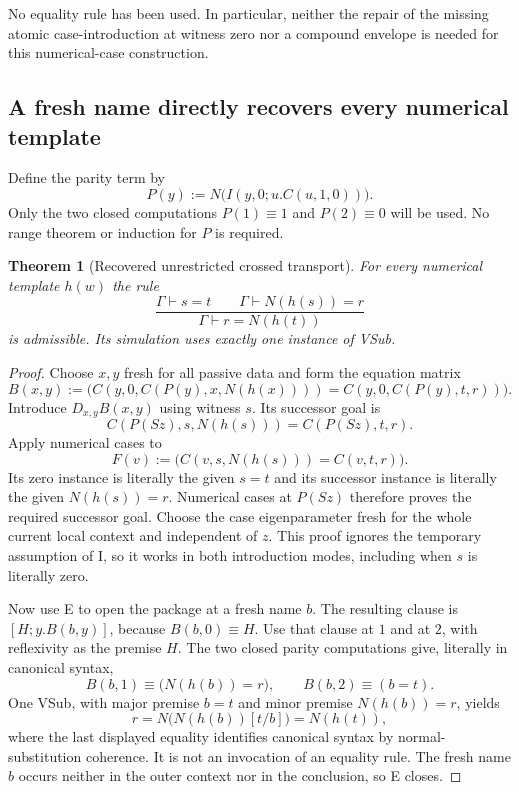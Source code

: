 \documentclass[11pt]{article}
\newtheorem{theorem}{Theorem}[section]
\theoremstyle{definition}
\theoremstyle{remark}
\begin{document}
No equality rule has been used. In particular, neither the repair of
the missing atomic case-introduction at witness zero nor a compound
envelope is needed for this numerical-case construction.

\subsection{A fresh name directly recovers every numerical template}

Define the parity term by
\[
 P(y):=N\bigl(I(y,0;u.C(u,1,0))\bigr).
\]
Only the two closed computations $P(1)\equiv1$ and $P(2)\equiv0$
will be used. No range theorem or induction for $P$ is required.

\begin{theorem}[Recovered unrestricted crossed transport]
For every numerical template $h(w)$ the rule
\[
 \frac{\Gamma\vdash s=t\qquad\Gamma\vdash N(h(s))=r}
      {\Gamma\vdash r=N(h(t))}
\]
is admissible. Its simulation uses exactly one instance of VSub.
\end{theorem}
\begin{proof}
Choose $x,y$ fresh for all passive data and form the equation matrix
\[
 B(x,y):=\bigl(
 C(y,0,C(P(y),x,N(h(x))))
 =C(y,0,C(P(y),t,r))\bigr).
\]
Introduce $D_{x,y}B(x,y)$ using witness $s$. Its successor goal is
\[
 C(P(Sz),s,N(h(s)))=C(P(Sz),t,r).
\]
Apply numerical cases to
\[
 F(v):=\bigl(C(v,s,N(h(s)))=C(v,t,r)\bigr).
\]
Its zero instance is literally the given $s=t$ and its successor
instance is literally the given $N(h(s))=r$. Numerical cases at
$P(Sz)$ therefore proves the required successor goal. Choose the
case eigenparameter fresh for the whole current local context and
independent of $z$. This proof ignores the temporary assumption
of I, so it works in both introduction modes, including when $s$
is literally zero.

Now use E to open the package at a fresh name $b$. The resulting
clause is $[H;y.B(b,y)]$, because $B(b,0)\equiv H$. Use that clause
at $1$ and at $2$, with reflexivity as the premise $H$. The two
closed parity computations give, literally in canonical syntax,
\[
 B(b,1)\equiv\bigl(N(h(b))=r\bigr),\qquad
 B(b,2)\equiv(b=t).
\]
One VSub, with major premise $b=t$ and minor premise $N(h(b))=r$,
yields
\[
 r=N\bigl(N(h(b))[t/b]\bigr)=N(h(t)),
\]
where the last displayed equality identifies canonical syntax by
normal-substitution coherence. It is not an invocation of an equality
rule. The fresh name $b$ occurs neither in the outer context nor in
the conclusion, so E closes.
\end{proof}
\end{document}
